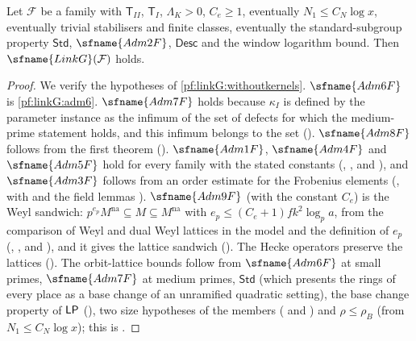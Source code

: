 \begin{theorem}\label{pf:linkG:fam}
Let $\mathcal F$ be a family with $\mathsf T_{II}$, $\mathsf T_{I}$, $\Lambda_K>0$,
$C_e\ge1$, eventually $N_1\le C_N\log x$, eventually trivial stabilisers and finite classes, eventually the
standard-subgroup property $\mathsf{Std}$, $\sfname{Adm2F}$, $\mathsf{Desc}$ and the window logarithm bound.
Then $\sfname{LinkG}(\mathcal F)$ holds.
\end{theorem}

\begin{proof}
We verify the hypotheses of \cref{pf:linkG:withoutkernels}. $\sfname{Adm6F}$ is \cref{pf:linkG:adm6}. $\sfname{Adm7F}$
holds because $\kappa_I$ is defined by the parameter instance as the infimum of the set of defects for which the
medium-prime statement holds, and this infimum belongs to the set ().
$\sfname{Adm8F}$ follows from the first theorem ().
$\sfname{Adm1F}$, $\sfname{Adm4F}$ and $\sfname{Adm5F}$ hold for every family with the stated constants
(, , and ),
and $\sfname{Adm3F}$ follows from an order estimate for the Frobenius elements
(, with
 and the field lemmas
). $\sfname{Adm9F}$ (with the constant $C_e$) is the
Weyl sandwich: $p^{e_p}M^{\mathrm{na}}\subseteq M\subseteq M^{\mathrm{na}}$ with $e_p\le(C_e+1)fk^2\log_pa$, from the
comparison of Weyl and dual Weyl lattices in the model and the definition of $e_p$
(, , and ),
and it gives the lattice sandwich (). The Hecke
operators preserve the lattices (). The orbit-lattice bounds
follow from $\sfname{Adm6F}$ at small primes, $\sfname{Adm7F}$ at medium primes, $\mathsf{Std}$ (which presents the
rings of every place as a base change of an unramified quadratic setting), the base change property of $\mathsf{LP}$
(), two size hypotheses of the members
( and ) and $\rho\le\rho_B$ (from
$N_1\le C_N\log x$); this is .
\end{proof}

